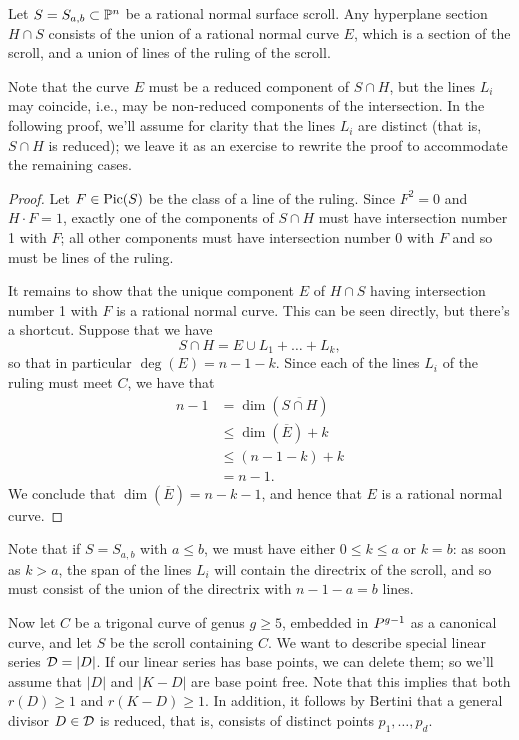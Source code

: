  

\begin{lemma}
Let $S = S_{a,b} \subset \PP^n$ be a rational normal surface scroll. Any hyperplane section $H \cap S$ consists of the union of a rational normal curve $E$, which is a section of the scroll, and a union of lines of the ruling of the scroll.
\end{lemma}

Note that the curve $E$ must be a reduced component of $S \cap H$, but the lines $L_i$ may coincide, i.e., may be non-reduced components of the intersection. In the following proof, we'll assume for clarity that the lines $L_i$ are distinct (that is, $S \cap H$ is reduced); we leave it as an exercise to rewrite the proof to accommodate the remaining cases.

\begin{proof}
Let $F \in \Pic(S)$ be the class of a line of the ruling. Since $F^2 = 0$ and $H\cdot F = 1$, exactly one of the components of $S \cap H$ must have intersection number 1 with $F$; all other components must have intersection number 0 with $F$ and so must be lines of the ruling.

It remains to show that the unique component $E$ of $H \cap S$ having intersection number 1 with $F$ is a rational normal curve. This can be seen directly, but there's a shortcut. Suppose that we have
$$
S \cap H = E \cup L_1 + \dots + L_k,
$$
so that in particular $\deg(E) = n-1-k$. Since each of the lines $L_i$ of the ruling must meet $C$, we have that
\begin{align*}
n-1 &= \dim(\overline{S \cap H}) \\
&\leq \dim(\overline {E}) + k\\
&\leq (n-1-k) + k \\
&= n-1.
\end{align*}
We conclude that $\dim(\overline E) = n-k-1$, and hence that $E$ is a rational normal curve.
\end{proof}

Note that if $S = S_{a,b}$ with $a \leq b$, we must have either $0 \leq k \leq a$ or $k = b$: as soon as $k > a$, the span of the lines $L_i$ will contain the directrix of the scroll, and so must consist of the union of the directrix with $n-1-a = b$ lines.

Now let $C$ be a trigonal curve of genus $g \geq 5$, embedded in $\\P^{g-1}$ as a canonical curve, and let $S$ be the scroll containing $C$. We want to describe special linear series $\cD = |D|$. If our linear series has base points, we can delete them; so we'll assume that $|D|$ and $|K-D|$ are base point free. Note that this implies that   both  $r(D) \geq 1$ and $r(K-D) \geq 1$. In addition, it follows by Bertini that a general divisor $D \in \cD$ is reduced, that is, consists of distinct points $p_1,\dots,p_d$.

